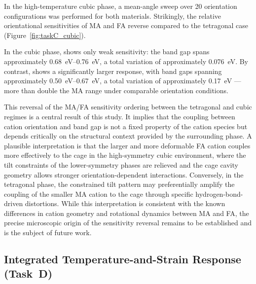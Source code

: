 In the high-temperature cubic phase, a mean-angle sweep over
20 orientation configurations was performed for both materials.
Strikingly, the relative orientational sensitivities of MA and FA
reverse compared to the tetragonal case
(Figure~\ref{fig:taskC_cubic}).

In the cubic phase, \MASnI{} shows only weak sensitivity: the band
gap spans approximately \SIrange{0.68}{0.76}{eV}, a total variation
of approximately \SI{0.076}{eV}.
By contrast, \FASnI{} shows a significantly larger response, with
band gaps spanning approximately \SIrange{0.50}{0.67}{eV}, a total
variation of approximately \SI{0.17}{eV} --- more than double the
MA range under comparable orientation conditions.

This reversal of the MA/FA sensitivity ordering between the
tetragonal and cubic regimes is a central result of this study.
It implies that the coupling between cation orientation and band gap
is not a fixed property of the cation species but depends critically
on the structural context provided by the surrounding phase.
A plausible interpretation is that the larger and more deformable
FA cation couples more effectively to the cage in the high-symmetry
cubic environment, where the tilt constraints of the lower-symmetry
phases are relieved and the cage cavity geometry allows stronger
orientation-dependent interactions.
Conversely, in the tetragonal phase, the constrained tilt pattern
may preferentially amplify the coupling of the smaller MA cation to
the cage through specific hydrogen-bond-driven distortions.
While this interpretation is consistent with the known differences
in cation geometry and rotational dynamics between MA and
FA,\cite{laven2023rotational, maheshwari2019relation} the precise microscopic
origin of the sensitivity reversal remains to be established and
is the subject of future work.


\subsection{Integrated Temperature-and-Strain Response (Task~D)}
\label{subsec:results_taskD}

